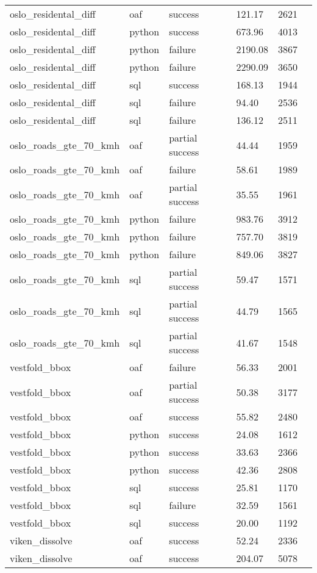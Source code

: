 \begin{longtable}{lp{1.8cm}p{1.8cm}p{1.8cm}p{1.8cm}p{1.8cm}}
oslo\_residental\_diff & oaf & success & 121.17 & 2621 \\
oslo\_residental\_diff & python & success & 673.96 & 4013 \\
oslo\_residental\_diff & python & failure & 2190.08 & 3867 \\
oslo\_residental\_diff & python & failure & 2290.09 & 3650 \\
oslo\_residental\_diff & sql & success & 168.13 & 1944 \\
oslo\_residental\_diff & sql & failure & 94.40 & 2536 \\
oslo\_residental\_diff & sql & failure & 136.12 & 2511 \\
oslo\_roads\_gte\_70\_kmh & oaf & partial success & 44.44 & 1959 \\
oslo\_roads\_gte\_70\_kmh & oaf & failure & 58.61 & 1989 \\
oslo\_roads\_gte\_70\_kmh & oaf & partial success & 35.55 & 1961 \\
oslo\_roads\_gte\_70\_kmh & python & failure & 983.76 & 3912 \\
oslo\_roads\_gte\_70\_kmh & python & failure & 757.70 & 3819 \\
oslo\_roads\_gte\_70\_kmh & python & failure & 849.06 & 3827 \\
oslo\_roads\_gte\_70\_kmh & sql & partial success & 59.47 & 1571 \\
oslo\_roads\_gte\_70\_kmh & sql & partial success & 44.79 & 1565 \\
oslo\_roads\_gte\_70\_kmh & sql & partial success & 41.67 & 1548 \\
vestfold\_bbox & oaf & failure & 56.33 & 2001 \\
vestfold\_bbox & oaf & partial success & 50.38 & 3177 \\
vestfold\_bbox & oaf & success & 55.82 & 2480 \\
vestfold\_bbox & python & success & 24.08 & 1612 \\
vestfold\_bbox & python & success & 33.63 & 2366 \\
vestfold\_bbox & python & success & 42.36 & 2808 \\
vestfold\_bbox & sql & success & 25.81 & 1170 \\
vestfold\_bbox & sql & failure & 32.59 & 1561 \\
vestfold\_bbox & sql & success & 20.00 & 1192 \\
viken\_dissolve & oaf & success & 52.24 & 2336 \\
viken\_dissolve & oaf & success & 204.07 & 5078 \\

\end{longtable}
